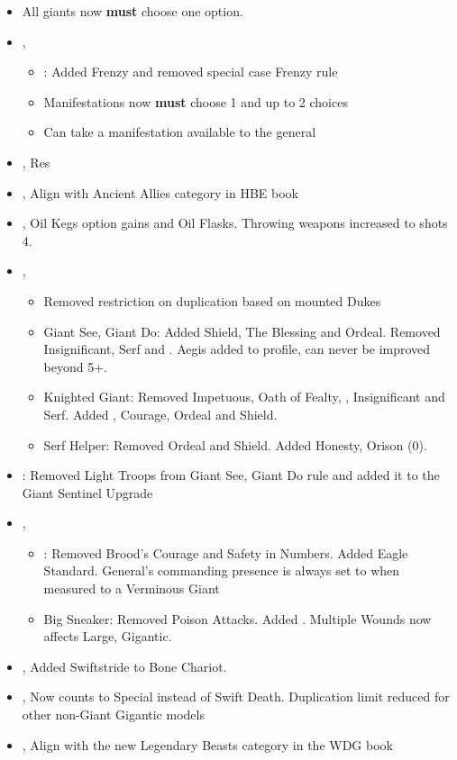 

\subtitle{Version 2022 beta 1}

{\normalfontsize
\begin{itemize}
	\item All giants now \textbf{must} choose one option.
	\item \possessedgiant{}, 
		\begin{itemize}
			\item \giantseegiantdo{}: Added Frenzy and removed special case Frenzy rule
			\item Manifestations now \textbf{must} choose 1 and up to 2 choices
			\item Can take a manifestation available to the general
		\end{itemize}
	
	\item \giantdwarf{}, Res  \costup{} 
	
	\item \highborngiant{}, Align with Ancient Allies category in HBE book
	
	\item \citizengiant{}, Oil Kegs option gains \la{} and Oil Flasks. Throwing weapons increased to shots 4.
	
	\item \feudalgiant{}, 
		\begin{itemize}
			\item Removed restriction on duplication based on mounted Dukes
			\item Giant See, Giant Do: Added Shield, The Blessing and Ordeal. Removed Insignificant, Serf and \la. Aegis added to profile, can never be improved beyond 5+.
			\item Knighted Giant: Removed Impetuous, Oath of Fealty, \ha, Insignificant and Serf. Added \la, Courage, Ordeal and Shield.
			\item Serf Helper: Removed Ordeal and Shield. Added Honesty, Orison (0).
		\end{itemize}
	\item \sylvangiant{}: Removed Light Troops from Giant See, Giant Do rule and added it to the Giant Sentinel Upgrade
	\item \verminousgiant{}, 
	\begin{itemize}
		\item \giantseegiantdo{}: Removed Brood's Courage and Safety in Numbers. Added Eagle Standard. General's commanding presence is always set to  when measured to a Verminous Giant
		\item Big Sneaker: Removed Poison Attacks. Added \pw. Multiple Wounds now affects Large, Gigantic.
	\end{itemize}
\item \ancientgiant{}, Added Swiftstride to Bone Chariot.
\item \corpsegiant{}, Now counts to Special instead of Swift Death. Duplication limit reduced for other non-Giant Gigantic models
\item \maraudinggiant{}, Align with the new Legendary Beasts category in the WDG book
\end{itemize}
}
